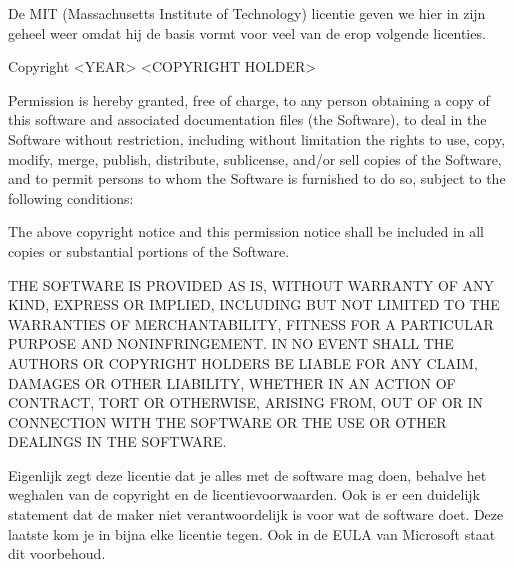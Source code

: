 De MIT (Massachusetts Institute of Technology) licentie geven we hier in zijn geheel weer omdat hij de basis vormt voor veel van de erop volgende licenties.

\bigskip

{
Copyright {\textless}YEAR{\textgreater} {\textless}COPYRIGHT HOLDER{\textgreater}}

{
Permission is hereby granted, free of charge, to any person obtaining a copy of this software and associated
documentation files (the {\textquotedbl}Software{\textquotedbl}), to deal in the Software without restriction,
including without limitation the rights to use, copy, modify, merge, publish, distribute, sublicense, and/or sell
copies of the Software, and to permit persons to whom the Software is furnished to do so, subject to the following
conditions:}

{
The above copyright notice and this permission notice shall be included in all copies or substantial portions of the
Software.}

{
THE SOFTWARE IS PROVIDED {\textquotedbl}AS IS{\textquotedbl}, WITHOUT WARRANTY OF ANY KIND, EXPRESS OR IMPLIED,
INCLUDING BUT NOT LIMITED TO THE WARRANTIES OF MERCHANTABILITY, FITNESS FOR A PARTICULAR PURPOSE AND NONINFRINGEMENT.
IN NO EVENT SHALL THE AUTHORS OR COPYRIGHT HOLDERS BE LIABLE FOR ANY CLAIM, DAMAGES OR OTHER LIABILITY, WHETHER IN AN
ACTION OF CONTRACT, TORT OR OTHERWISE, ARISING FROM, OUT OF OR IN CONNECTION WITH THE SOFTWARE OR THE USE OR OTHER
DEALINGS IN THE SOFTWARE.}

\bigskip

Eigenlijk zegt deze licentie dat je alles met de software mag doen, behalve het weghalen van de copyright en de
licentievoorwaarden. Ook is er een duidelijk statement dat de maker niet verantwoordelijk is voor wat de software doet. Deze laatste kom je
in bijna elke licentie tegen. Ook in de EULA van Microsoft staat dit voorbehoud.

